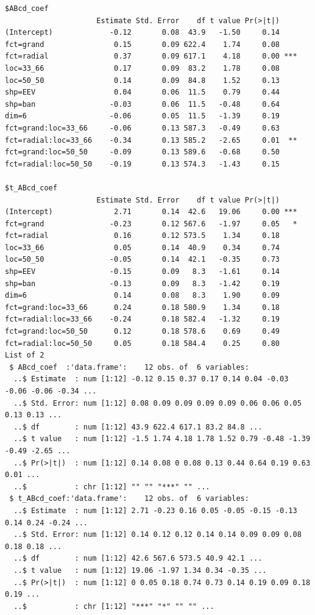 \documentclass{monashthesis}
\begin{document}
\begin{verbatim}
$ABcd_coef
                     Estimate Std. Error    df t value Pr(>|t|)    
(Intercept)             -0.12       0.08  43.9   -1.50     0.14    
fct=grand                0.15       0.09 622.4    1.74     0.08    
fct=radial               0.37       0.09 617.1    4.18     0.00 ***
loc=33_66                0.17       0.09  83.2    1.78     0.08    
loc=50_50                0.14       0.09  84.8    1.52     0.13    
shp=EEV                  0.04       0.06  11.5    0.79     0.44    
shp=ban                 -0.03       0.06  11.5   -0.48     0.64    
dim=6                   -0.06       0.05  11.5   -1.39     0.19    
fct=grand:loc=33_66     -0.06       0.13 587.3   -0.49     0.63    
fct=radial:loc=33_66    -0.34       0.13 585.2   -2.65     0.01  **
fct=grand:loc=50_50     -0.09       0.13 589.6   -0.68     0.50    
fct=radial:loc=50_50    -0.19       0.13 574.3   -1.43     0.15    

$t_ABcd_coef
                     Estimate Std. Error    df t value Pr(>|t|)    
(Intercept)              2.71       0.14  42.6   19.06     0.00 ***
fct=grand               -0.23       0.12 567.6   -1.97     0.05   *
fct=radial               0.16       0.12 573.5    1.34     0.18    
loc=33_66                0.05       0.14  40.9    0.34     0.74    
loc=50_50               -0.05       0.14  42.1   -0.35     0.73    
shp=EEV                 -0.15       0.09   8.3   -1.61     0.14    
shp=ban                 -0.13       0.09   8.3   -1.42     0.19    
dim=6                    0.14       0.08   8.3    1.90     0.09    
fct=grand:loc=33_66      0.24       0.18 580.9    1.34     0.18    
fct=radial:loc=33_66    -0.24       0.18 582.4   -1.32     0.19    
fct=grand:loc=50_50      0.12       0.18 578.6    0.69     0.49    
fct=radial:loc=50_50     0.05       0.18 584.4    0.25     0.80    
List of 2
 $ ABcd_coef  :'data.frame':    12 obs. of  6 variables:
  ..$ Estimate  : num [1:12] -0.12 0.15 0.37 0.17 0.14 0.04 -0.03 -0.06 -0.06 -0.34 ...
  ..$ Std. Error: num [1:12] 0.08 0.09 0.09 0.09 0.09 0.06 0.06 0.05 0.13 0.13 ...
  ..$ df        : num [1:12] 43.9 622.4 617.1 83.2 84.8 ...
  ..$ t value   : num [1:12] -1.5 1.74 4.18 1.78 1.52 0.79 -0.48 -1.39 -0.49 -2.65 ...
  ..$ Pr(>|t|)  : num [1:12] 0.14 0.08 0 0.08 0.13 0.44 0.64 0.19 0.63 0.01 ...
  ..$           : chr [1:12] "" "" "***" "" ...
 $ t_ABcd_coef:'data.frame':    12 obs. of  6 variables:
  ..$ Estimate  : num [1:12] 2.71 -0.23 0.16 0.05 -0.05 -0.15 -0.13 0.14 0.24 -0.24 ...
  ..$ Std. Error: num [1:12] 0.14 0.12 0.12 0.14 0.14 0.09 0.09 0.08 0.18 0.18 ...
  ..$ df        : num [1:12] 42.6 567.6 573.5 40.9 42.1 ...
  ..$ t value   : num [1:12] 19.06 -1.97 1.34 0.34 -0.35 ...
  ..$ Pr(>|t|)  : num [1:12] 0 0.05 0.18 0.74 0.73 0.14 0.19 0.09 0.18 0.19 ...
  ..$           : chr [1:12] "***" "*" "" "" ...
\end{verbatim}
\end{document}
